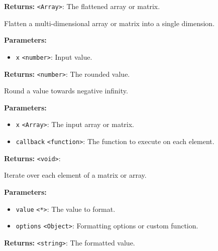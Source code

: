 \documentclass[12pt,a4paper]{article}
\begin{document}
\noindent \textbf{Returns:} \texttt{<Array>}: The flattened array or matrix.

\noindent Flatten a multi-dimensional array or matrix into a single dimension.

\vspace{5mm}
\noindent {}


\noindent \textbf{Parameters:}
\begin{itemize}
  \item \texttt{x} \texttt{<number>}: Input value.
\end{itemize}

\noindent \textbf{Returns:} \texttt{<number>}: The rounded value.

\noindent Round a value towards negative infinity.

\vspace{5mm}
\noindent {}


\noindent \textbf{Parameters:}
\begin{itemize}
  \item \texttt{x} \texttt{<Array>}: The input array or matrix.
  \item \texttt{callback} \texttt{<function>}: The function to execute on each element.
\end{itemize}

\noindent \textbf{Returns:} \texttt{<void>}: 

\noindent Iterate over each element of a matrix or array.

\vspace{5mm}
\noindent {}


\noindent \textbf{Parameters:}
\begin{itemize}
  \item \texttt{value} \texttt{<*>}: The value to format.
  \item \texttt{options} \texttt{<Object>}: Formatting options or custom function.
\end{itemize}

\noindent \textbf{Returns:} \texttt{<string>}: The formatted value.
\end{document}
